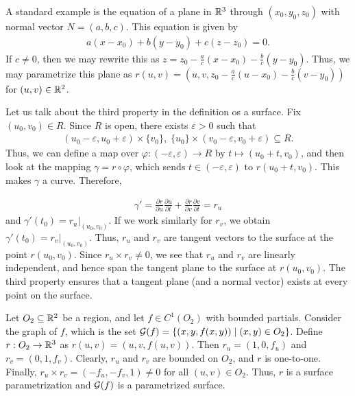 A standard example is the equation of a plane in $\mathbb{R}^{3}$ through $(x_{0},y_{0},z_{0})$ with normal vector $N = (a,b,c)$. This equation is given by
\begin{align}
    a(x-x_{0}) + b(y-y_{0}) + c(z-z_{0}) = 0.
\end{align}
If $c \neq 0$, then we may rewrite this as $z = z_{0} - \frac{a}{c}(x-x_{0}) - \frac{b}{c}(y-y_{0})$. Thus, we may parametrize this plane as $r(u,v) = (u,v,z_{0} - \frac{a}{c}(u-x_{0}) - \frac{b}{c}(v-y_{0}))$ for $(u,v) \in \mathbb{R}^{2}$.

Let us talk about the third property in the definition os a surface. Fix $(u_{0},v_{0}) \in R$. Since $R$ is open, there exists $\varepsilon > 0$ such that
\begin{align}
    (u_{0}-\varepsilon,u_{0}+\varepsilon) \times \{v_{0}\},\;\{u_{0}\} \times (v_{0}-\varepsilon,v_{0}+\varepsilon) \subseteq R.
\end{align}
Thus, we can define a map over $\varphi:(-\varepsilon,\varepsilon) \to R$ by $t \mapsto (u_{0}+t,v_{0})$, and then look at the mapping $\gamma = r \circ \varphi$, which sends $t \in (-\varepsilon,\varepsilon)$ to $r(u_{0}+t,v_{0})$. This makes $\gamma$ a curve. Therefore,

\begin{align}
    \gamma' = \frac{\partial r}{\partial u} \frac{\partial u}{\partial t} + \frac{\partial r}{\partial v} \frac{\partial v}{\partial t} = r_{u}
\end{align}
and $\gamma'(t_{0}) = r_{u}|_{(u_{0},v_{0})}$. If we work similarly for $r_{v}$, we obtain $\gamma'(t_{0}) = r_{v}|_{(u_{0},v_{0})}$. Thus, $r_{u}$ and $r_{v}$ are tangent vectors to the surface at the point $r(u_{0},v_{0})$. Since $r_{u} \times r_{v} \neq 0$, we see that $r_{u}$ and $r_{v}$ are linearly independent, and hence span the tangent plane to the surface at $r(u_{0},v_{0})$. The third property ensures that a tangent plane (and a normal vector) exists at every point on the surface.

\begin{example}
    Let $O_{2} \subseteq \mathbb{R}^{2}$ be a region, and let $f \in C^{1}(O_{2})$ with bounded partials. Consider the graph of $f$, which is the set $\mathcal{G}(f) = \{(x,y,f(x,y)) \mid (x,y) \in O_{2}\}$. Define $r:O_{2} \to \mathbb{R}^{3}$ as $r(u,v) = (u,v,f(u,v))$. Then $r_{u} = (1,0,f_{u})$ and $r_{v} = (0,1,f_{v})$. Clearly, $r_{u}$ and $r_{v}$ are bounded on $O_{2}$, and $r$ is one-to-one. Finally, $r_{u} \times r_{v} = (-f_{u},-f_{v},1) \neq 0$ for all $(u,v) \in O_{2}$. Thus, $r$ is a surface parametrization and $\mathcal{G}(f)$ is a parametrized surface.
\end{example}

